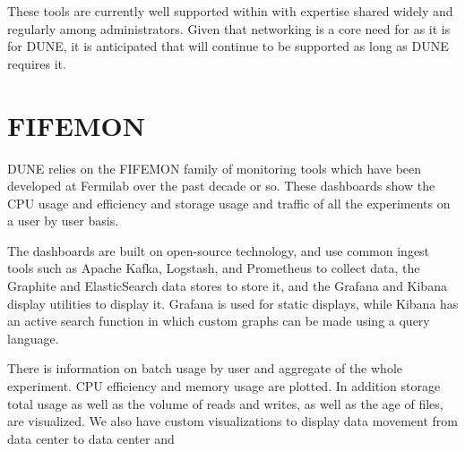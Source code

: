\documentclass[../main-v1.tex]{subfiles}
\begin{document}
These tools are currently well supported within  with %
expertise shared widely and regularly among administrators.
Given %
that networking is a core need for  as it is for DUNE, it is anticipated that  %
will continue to be supported %
as long as DUNE requires it.

\section{FIFEMON}\label{is:fifemon}

DUNE relies on the FIFEMON \cite{bib:fifemon}  family of monitoring tools which have been developed at Fermilab over the past
decade or so.  These dashboards show the CPU usage and efficiency and storage usage and traffic of
all the experiments on a user by user basis.

The dashboards are built on open-source technology, and use common ingest tools such as Apache Kafka, Logstash,
and Prometheus to collect data, the Graphite and ElasticSearch data stores to store it, and the Grafana and Kibana 
display utilities to display it.  Grafana is used for static displays, while Kibana has an active search function in which custom graphs can be made using a query language.  

There is information on batch usage by user and aggregate of the whole experiment.  CPU efficiency and memory usage are plotted. In addition storage total usage as well as the volume of reads and writes, as well as the age of files, are visualized.  We also have custom visualizations to display data movement from data center to data center and





\end{document}
